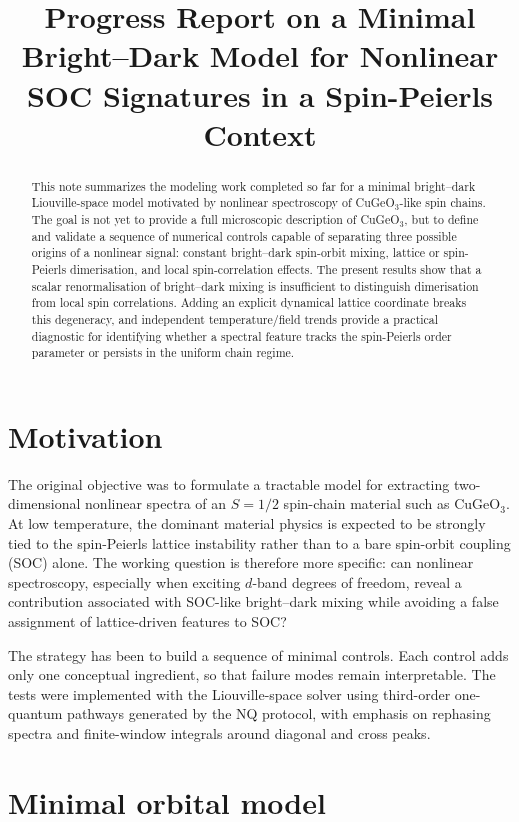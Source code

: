 \documentclass[10pt,twocolumn]{article}
\title{\vspace{-1.2em}
Progress Report on a Minimal Bright--Dark Model for Nonlinear SOC Signatures in a Spin-Peierls Context}
\author{}
\date{\vspace{-1.5em}}
\begin{document}
\maketitle

\begin{abstract}
This note summarizes the modeling work completed so far for a minimal
bright--dark Liouville-space model motivated by nonlinear spectroscopy of
CuGeO$_3$-like spin chains.  The goal is not yet to provide a full microscopic
description of CuGeO$_3$, but to define and validate a sequence of numerical
controls capable of separating three possible origins of a nonlinear signal:
constant bright--dark spin-orbit mixing, lattice or spin-Peierls dimerisation,
and local spin-correlation effects.  The present results show that a scalar
renormalisation of bright--dark mixing is insufficient to distinguish
dimerisation from local spin correlations.  Adding an explicit dynamical
lattice coordinate breaks this degeneracy, and independent temperature/field
trends provide a practical diagnostic for identifying whether a spectral
feature tracks the spin-Peierls order parameter or persists in the uniform
chain regime.
\end{abstract}

\section{Motivation}

The original objective was to formulate a tractable model for extracting
two-dimensional nonlinear spectra of an $S=1/2$ spin-chain material such as
CuGeO$_3$.  At low temperature, the dominant material physics is expected to be
strongly tied to the spin-Peierls lattice instability rather than to a bare
spin-orbit coupling (SOC) alone.  The working question is therefore more
specific: can nonlinear spectroscopy, especially when exciting $d$-band
degrees of freedom, reveal a contribution associated with SOC-like
bright--dark mixing while avoiding a false assignment of lattice-driven
features to SOC?

The strategy has been to build a sequence of minimal controls.  Each control
adds only one conceptual ingredient, so that failure modes remain interpretable.
The tests were implemented with the Liouville-space solver using third-order
one-quantum pathways generated by the NQ protocol, with emphasis on rephasing
spectra and finite-window integrals around diagonal and cross peaks.

\section{Minimal orbital model}
\end{document}
